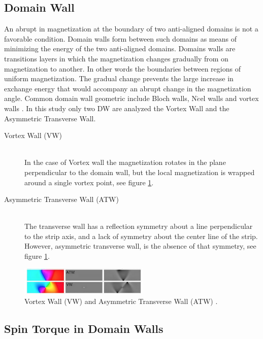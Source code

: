 \subsection{Domain Wall}

An abrupt in magnetization at the boundary of two anti-aligned domains is not a favorable condition. Domain walls form between such domains as means of minimizing the energy of the two anti-aligned domains. Domains walls are transitions layers in which the magnetization changes gradually from on magnetization to another. In other words the boundaries between regions of uniform magnetization. The gradual change prevents the large increase in exchange energy that would accompany an abrupt change in the magnetization angle. Common domain wall geometric include Bloch walls, N$\acute{e}$el walls and vortex walls \cite{spindomain}. In this study only two DW are analyzed the Vortex Wall and the Asymmetric Transverse Wall.

\begin{description}
  \item[Vortex Wall (VW)] \hfill \\
   In the case of Vortex wall the magnetization rotates in the plane perpendicular to the domain wall, but the local magnetization is wrapped around a single vortex point, see figure \ref{fig:dw}.
   
 \item[Asymmetric Transverse Wall (ATW)] \hfill \\
 The transverse wall has a reflection symmetry about a line perpendicular to the strip axis, and a lack of symmetry about the center line of the strip. However, asymmetric transverse wall, is the absence of that symmetry, see figure \ref{fig:dw}.
 
\end{description}

\begin{figure}[htbp]
	\centering
		\includegraphics[width=0.55\textwidth]{Figures/dw.png}
		\smallskip
	\caption[Domain Wall VW, ATW]{Vortex Wall (VW) and Asymmetric Transverse Wall (ATW) \cite{claudio}.}
	\label{fig:dw}
\end{figure}

\subsection{Spin Torque in Domain Walls}

